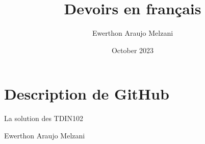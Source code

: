 \documentclass{article}
\title{Devoirs en français}
\author{Ewerthon Araujo Melzani}
\date{October 2023}
\begin{document}
\maketitle

\section*{Description de GitHub}

\vspace*{1.5 cm}

La solution des TDIN102

\vspace*{1.5 cm}



\large Ewerthon Araujo Melzani
\end{document}
